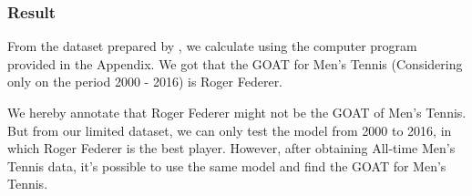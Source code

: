 \subsubsection{Result}
From the dataset prepared by \cite{ATP_data}, we calculate using the computer program provided in the Appendix. We got that the GOAT for Men's Tennis (Considering only on the period 2000 - 2016) is Roger Federer. %

We hereby annotate that Roger Federer might not be the GOAT of Men's Tennis. But from our limited dataset, we can only test the model from 2000 to 2016, in which Roger Federer is the best player. However, after obtaining All-time Men's Tennis data, it's possible to use the same model and find the GOAT for Men's Tennis. %

